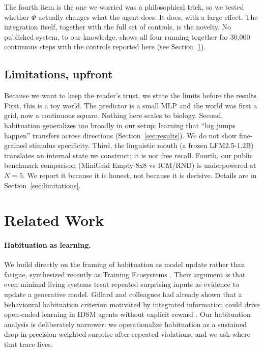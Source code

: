 \documentclass[11pt,a4paper]{article}
\begin{document}
The fourth item is the one we worried was a philosophical trick, so we tested whether $\Phi$ actually changes what the agent does. It does, with a large effect. The integration itself, together with the full set of controls, is the novelty. No published system, to our knowledge, shows all four running together for 30,000 continuous steps with the controls reported here (see Section~\ref{sec:related}).

\subsection{Limitations, upfront}

Because we want to keep the reader's trust, we state the limits before the results. First, this is a toy world. The predictor is a small MLP and the world was first a grid, now a continuous square. Nothing here scales to biology. Second, habituation generalizes too broadly in our setup: learning that ``big jumps happen'' transfers across directions (Section~\ref{sec:results}). We do not show fine-grained stimulus specificity. Third, the linguistic mouth (a frozen LFM2.5-1.2B) translates an internal state we construct; it is not free recall. Fourth, our public benchmark comparison (MiniGrid Empty-8x8 vs ICM/RND) is underpowered at $N=5$. We report it because it is honest, not because it is decisive. Details are in Section~\ref{sec:limitations}.

\section{Related Work}
\label{sec:related}

\paragraph{Habituation as learning.} We build directly on the framing of habituation as model update rather than fatigue, synthesized recently as Training Ecosystems \cite{levin2026}. Their argument is that even minimal living systems treat repeated surprising inputs as evidence to update a generative model. Gillard and colleagues had already shown that a behavioural habituation criterion motivated by integrated information could drive open-ended learning in IDSM agents without explicit reward \cite{gillard2022}. Our habituation analysis is deliberately narrower: we operationalize habituation as a sustained drop in precision-weighted surprise after repeated violations, and we ask where that trace lives.
\end{document}
